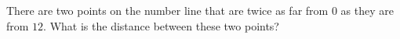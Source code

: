 There are two points on the number line that are twice as far from $0$ as they are from $12$. What is the distance between these two points?
